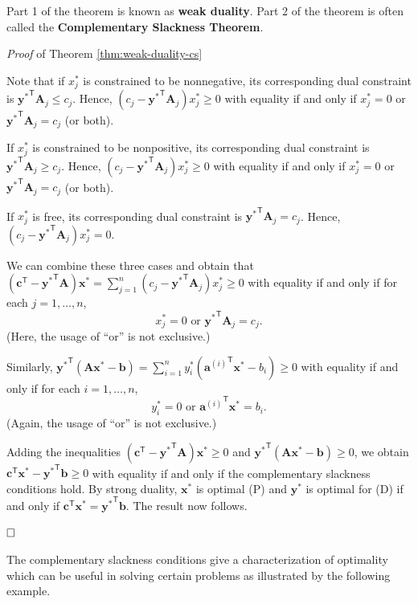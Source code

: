 \documentclass[]{book}
\newcommand{\T}{\mathsf{T}}
\newcommand{\mm}[1]{\mathbf{#1}}
\renewcommand{\vec}[1]{\mathbf{#1}}
\theoremstyle{definition}
\theoremstyle{definition}
\theoremstyle{remark}
\begin{document}
Part 1 of the theorem is known as \textbf{weak duality}. Part 2 of the
theorem is often called the \textbf{Complementary Slackness Theorem}.

\emph{Proof} of Theorem \ref{thm:weak-duality-cs}

Note that if \(x^*_j\) is constrained to be nonnegative, its
corresponding dual constraint is \(\vec{y^*}^\T \mm{A}_j \leq c_j\).
Hence, \((c_j - \vec{y^*}^\T \mm{A}_j)x^*_j \geq 0\) with equality if
and only if \(x^*_j = 0\) or \(\vec{y^*}^\T \mm{A}_j = c_j\) (or both).

If \(x^*_j\) is constrained to be nonpositive, its corresponding dual
constraint is \(\vec{y^*}^\T \mm{A}_j \geq c_j\). Hence,
\((c_j - \vec{y^*}^\T \mm{A}_j)x^*_j \geq 0\) with equality if and only
if \(x^*_j = 0\) or \(\vec{y^*}^\T \mm{A}_j = c_j\) (or both).

If \(x^*_j\) is free, its corresponding dual constraint is
\(\vec{y^*}^\T \mm{A}_j = c_j\). Hence,
\((c_j - \vec{y^*}^\T \mm{A}_j)x^*_j = 0\).

We can combine these three cases and obtain that
\((\vec{c}^\T - \vec{y^*}^\T \mm{A})\vec{x^*} = \displaystyle\sum_{j = 1}^n (c_j - \vec{y^*}^\T \mm{A}_j) x^*_j \geq 0\)
with equality if and only if for each \(j = 1,\ldots, n\),
\[x^*_j = 0 \text{ or } \vec{y^*}^\T \mm{A}_j = c_j.\] (Here, the usage
of ``or'' is not exclusive.)

Similarly,
\(\vec{y^*}^\T(\mm{A}\vec{x^*} - \vec{b}) = \displaystyle\sum_{i = 1}^n y^*_i({\vec{a}^{(i)}}^\T \vec{x^*} - b_i) \geq 0\)
with equality if and only if for each \(i = 1,\ldots, n\),
\[y^*_i = 0 \text{ or } {\vec{a}^{(i)}}^\T \vec{x^*} = b_i.\] (Again,
the usage of ``or'' is not exclusive.)

Adding the inequalities
\((\vec{c}^\T - \vec{y^*}^\T \mm{A})\vec{x^*} \geq 0\) and
\(\vec{y^*}^\T(\mm{A}\vec{x^*} - \vec{b}) \geq 0\), we obtain
\(\vec{c}^\T\vec{x}^* - \vec{y^*}^\T\vec{b} \geq 0\) with equality if
and only if the complementary slackness conditions hold. By strong
duality, \(\vec{x}^*\) is optimal (P) and \(\vec{y}^*\) is optimal for
(D) if and only if \(\vec{c}^\T \vec{x}^* = \vec{y^*}^\T\vec{b}.\) The
result now follows.

\(\qed\)

The complementary slackness conditions give a characterization of
optimality which can be useful in solving certain problems as
illustrated by the following example.
\end{document}
